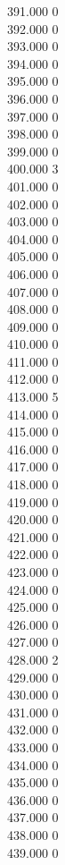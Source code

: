 { 391.000	0 \\
 392.000	0 \\
 393.000	0 \\
 394.000	0 \\
 395.000	0 \\
 396.000	0 \\
 397.000	0 \\
 398.000	0 \\
 399.000	0 \\
 400.000	3 \\
 401.000	0 \\
 402.000	0 \\
 403.000	0 \\
 404.000	0 \\
 405.000	0 \\
 406.000	0 \\
 407.000	0 \\
 408.000	0 \\
 409.000	0 \\
 410.000	0 \\
 411.000	0 \\
 412.000	0 \\
 413.000	5 \\
 414.000	0 \\
 415.000	0 \\
 416.000	0 \\
 417.000	0 \\
 418.000	0 \\
 419.000	0 \\
 420.000	0 \\
 421.000	0 \\
 422.000	0 \\
 423.000	0 \\
 424.000	0 \\
 425.000	0 \\
 426.000	0 \\
 427.000	0 \\
 428.000	2 \\
 429.000	0 \\
 430.000	0 \\
 431.000	0 \\
 432.000	0 \\
 433.000	0 \\
 434.000	0 \\
 435.000	0 \\
 436.000	0 \\
 437.000	0 \\
 438.000	0 \\
 439.000	0 \\
}
